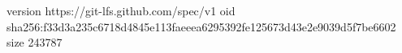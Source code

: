 version https://git-lfs.github.com/spec/v1
oid sha256:f33d3a235c6718d4845e113faeeea6295392fe125673d43e2e9039d5f7be6602
size 243787
